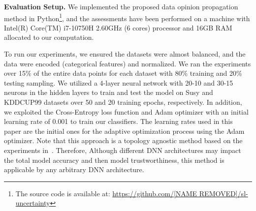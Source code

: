 \vspace{.2cm}
\noindent
\textbf{Evaluation Setup.}
We implemented the proposed data opinion propagation method in Python\footnote{The source code is available at: \url{https://github.com/[NAME REMOVED]/sl-uncertainty}}, and the assessments have been performed on a machine with Intel(R) Core(TM) i7-10750H 2.60GHz (6 cores) processor and 16GB RAM allocated to our computation. 

To run our experiments, we ensured the datasets were almost balanced, and the data were encoded (categorical features) and normalized. We ran the experiments over 15\% of the entire data points for each dataset with 80\% training and 20\% testing sampling. We utilized a 4-layer neural network with 20-10 and 30-15 neurons in the hidden layers to train and test the model on Susy and KDDCUP99 datasets over 50 and 20 training epochs, respectively. In addition, we exploited the Cross-Entropy loss function and Adam optimizer with an initial learning rate of 0.001 to train our classifiers. {\color{blue}The learning rates used in this paper are the initial ones for the adaptive optimization process using the Adam optimizer. Note that this approach is a topology agnostic method based on the experiments in~\cite{hope}. Therefore, Although different DNN architectures may impact the total model accuracy and then model trustworthiness, this method is applicable by any arbitrary DNN architecture.}

